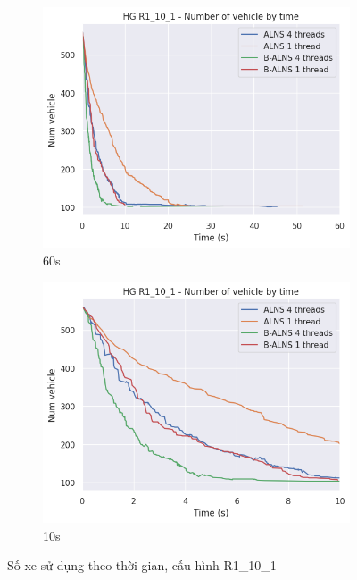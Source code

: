 \begin{figure}[H] %
  \label{fig:perf_ct_r1_10}
  \begin{subfigure}{.5\textwidth}
    \centering
    \includegraphics[width=0.9\linewidth]{figures/nv_time_60s_R1_10_1.png}
    \caption{60s}
    \label{fig:perf_ct_r1_10_60s}
  \end{subfigure}%
  \begin{subfigure}{.5\textwidth}
    \centering
    \includegraphics[width=0.9\linewidth]{figures/nv_time_10s_R1_10_1.png}
    \caption{10s}
    \label{fig:perf_ct_r1_10_10s}
  \end{subfigure}
  \caption{Số xe sử dụng theo thời gian, cấu hình R1\_10\_1}
\end{figure}

